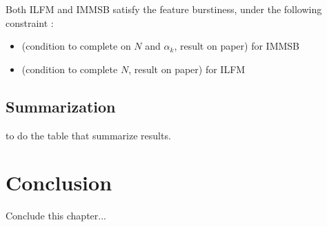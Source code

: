 \begin{proposition}\label{th:feature_mg}
    Both ILFM and IMMSB satisfy the feature burstiness, under the following constraint :
    \begin{itemize}
        \item (condition to complete on $N$ and $\alpha_k$, result on paper) for IMMSB
        \item (condition to complete $N$, result on paper) for ILFM
    \end{itemize}
\item 
\end{proposition}


\subsection{Summarization}

to do the table that summarize results.




\section{Conclusion}

Conclude  this chapter...
